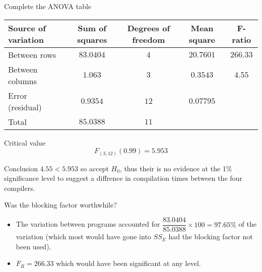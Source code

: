 \begin{example}
        \begin{step}{Complete the ANOVA table}
        \begin{center}
        \begin{tabular}{l|c|c|c|c}
        Source of variation & Sum of squares    & Degrees of freedom    & Mean square   & F-ratio       \\
        \hline
        Between rows        & $83.0404$         & $4$                   & $20.7601$     & $266.33$      \\
        Between columns     & $1.063$           & $3$                   & $0.3543$      & $4.55$        \\
        Error (residual)    & $0.9354$          & $12$                  & $0.07795$     &               \\
        \hline
        Total               & $85.0388$         & $11$                  &               &               \\
        \end{tabular}
        \end{center}
        \end{step}

        \begin{step}{Critical value}
        $$
        F_{(3, 12)}(0.99) = 5.953
        $$
        \end{step}

        \begin{step}{Conclusion}
        $4.55 < 5.953$ so accept $H_0$, thus their is no evidence at the 1\% significance level to suggest a diffrence in compilation times between the four compilers.
        \end{step}

        \begin{step}{Was the blocking factor worthwhile?}
        \begin{itemize}
        \item The variation between programs accounted for $\dfrac{83.0404}{85.0388} \times 100 = 97.65\%$ of the variation (which most would have gone into $SS_E$ had the blocking factor not been used).
        \item $F_R = 266.33$ which would have been significant at any level.
        \end{itemize}
        \end{step}

        \end{example}


